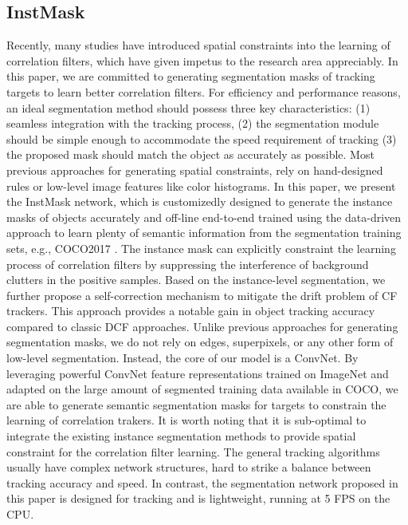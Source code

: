 \documentclass[review]{elsarticle}
\begin{document}
\begin{CJK*}{UTF8}{gbsn}
\subsection{InstMask}
Recently, many studies \cite{Danelljan2015LearningSR, Lukezic2017DiscriminativeCF, Galoogahi2017LearningBC, Xu2018LearningAD, Feng2018LearningSR} have introduced spatial constraints into the learning of correlation filters, which have given impetus to the research area appreciably. In this paper, we are committed to generating segmentation masks of tracking targets to learn better correlation filters. For efficiency and performance reasons, an ideal segmentation method should possess three key characteristics: (1) seamless integration with the tracking process, (2) the segmentation module should be simple enough to accommodate the speed requirement of tracking (3) the proposed mask should match the object as accurately as possible.
Most previous approaches for generating spatial constraints, rely on hand-designed rules or low-level image features like color histograms.
In this paper, we present the InstMask network, which is customizedly designed to generate the instance masks of objects accurately and off-line end-to-end trained using the data-driven approach to learn plenty of semantic information from the segmentation training sets, e.g., COCO2017 \cite{Lin2014MicrosoftCC}. The instance mask can explicitly constraint the learning process of correlation filters by suppressing the interference of background clutters in the positive samples. Based on the instance-level segmentation, we further propose a self-correction mechanism to mitigate the drift problem of CF trackers. This approach provides a notable gain in object tracking accuracy compared to classic DCF approaches.
Unlike previous approaches for generating segmentation masks, we do not rely on edges, superpixels, or any other form of low-level segmentation. Instead, the core of our model is a ConvNet. By leveraging powerful ConvNet feature representations trained on ImageNet and adapted on the large amount of segmented training data available in COCO, we are able to generate semantic segmentation masks for targets to constrain the learning of correlation trakers.
It is worth noting that it is sub-optimal to integrate the existing instance segmentation methods to provide spatial constraint for the correlation filter learning. The general tracking algorithms usually have complex network structures, hard to strike a balance between tracking accuracy and speed. In contrast, the segmentation network proposed in this paper is designed for tracking and is lightweight, running at 5 FPS on the CPU.


\end{CJK*}
\end{document}
